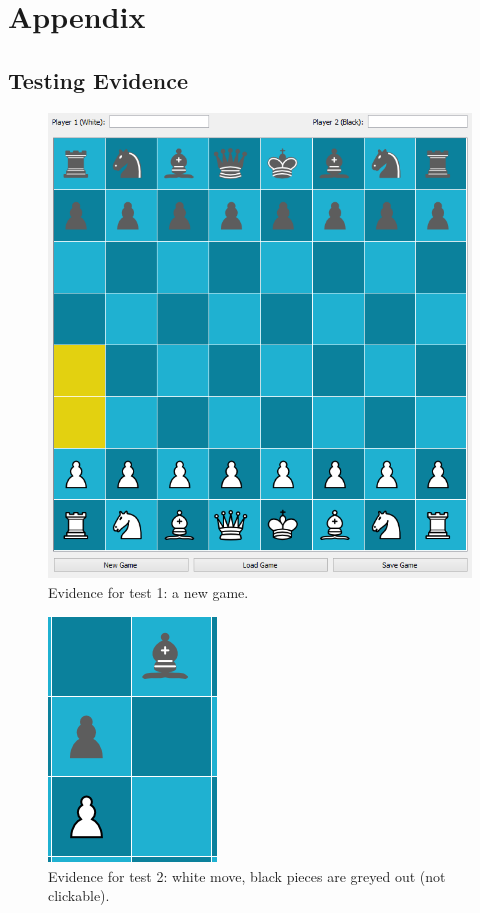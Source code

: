 \appendix
\chapter{Appendix} \label{appendix}
\section{Testing Evidence}
\begin{figure}
	\centering
	\includegraphics{images/screenshots/gui-overview}
	\caption{Evidence for test 1: a new game.}
	\label{test-1}
\end{figure}
\begin{figure}
	\centering
	\includegraphics{images/screenshots/test-2}
	\caption{Evidence for test 2: white move, black pieces are greyed out (not clickable).}
	\label{test-2}
\end{figure}
